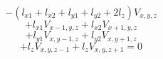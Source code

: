 \documentclass[12pt]{article}
\begin{document}
\begin{displaymath}
-(l_{x1}+l_{x2}+l_{y1}+l_{y2}+2l_{z})V_{x,y,z}
\end{displaymath}
\begin{displaymath}
+l_{x1}V_{x-1,y,z}+l_{x2}V_{x+1,y,z}
\end{displaymath}
\begin{displaymath}
+l_{y1}V_{x,y-1,z}+l_{y2}V_{x,y+1,z}
\end{displaymath}
\begin{displaymath}
+l_{z}V_{x,y,z-1}+l_{z}V_{x,y,z+1}=0
\end{displaymath}
\end{document}
